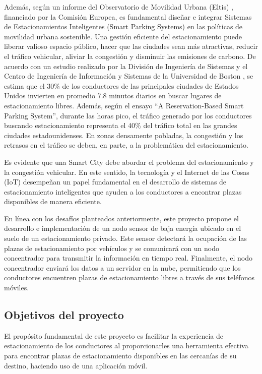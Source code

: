Además, según un informe del Observatorio de Movilidad Urbana (Eltis) \cite{ref2}, financiado por la Comisión Europea, es fundamental diseñar e integrar Sistemas de Estacionamientos Inteligentes (Smart Parking Systems) en las políticas de movilidad urbana sostenible. Una gestión eficiente del estacionamiento puede liberar valioso espacio público, hacer que las ciudades sean más atractivas, reducir el tráfico vehicular, aliviar la congestión y disminuir las emisiones de carbono. De acuerdo con un estudio realizado por la División de Ingeniería de Sistemas y el Centro de Ingeniería de Información y Sistemas de la Universidad de Boston \cite{ref3}, se estima que el 30\% de los conductores de las principales ciudades de Estados Unidos invierten en promedio 7.8 minutos diarios en buscar lugares de estacionamiento libres. Además, según el ensayo ``A Reservation-Based Smart Parking System''\cite{ref4}, durante las horas pico, el tráfico generado por los conductores buscando estacionamiento representa el 40\% del tráfico total en las grandes ciudades estadounidenses. En zonas densamente pobladas, la congestión y los retrasos en el tráfico se deben, en parte, a la problemática del estacionamiento.

Es evidente que una Smart City debe abordar el problema del estacionamiento y la congestión vehicular. En este sentido, la tecnología y el Internet de las Cosas (IoT) desempeñan un papel fundamental en el desarrollo de sistemas de estacionamiento inteligentes que ayuden a los conductores a encontrar plazas disponibles de manera eficiente.

En línea con los desafíos planteados anteriormente, este proyecto propone el desarrollo e implementación de un nodo sensor de baja energía ubicado en el suelo de un estacionamiento privado. Este sensor detectará la ocupación de las plazas de estacionamiento por vehículos y se comunicará con un nodo concentrador para transmitir la información en tiempo real. Finalmente, el nodo concentrador enviará los datos a un servidor en la nube, permitiendo que los conductores encuentren plazas de estacionamiento libres a través de sus teléfonos móviles.

\subsection{Objetivos del proyecto}
El propósito fundamental de este proyecto es facilitar la experiencia de estacionamiento de los conductores al proporcionarles una herramienta efectiva para encontrar plazas de estacionamiento disponibles en las cercanías de su destino, haciendo uso de una aplicación móvil.

